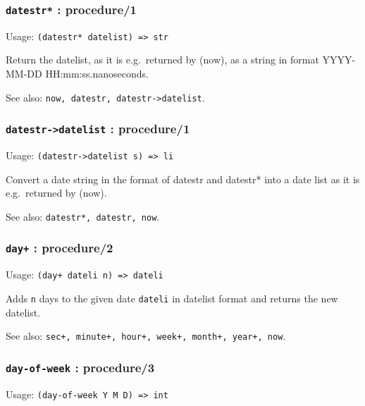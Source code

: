 \documentclass[
]{article}
\newcommand{\passthrough}[1]{#1}
\begin{document}
\hypertarget{datestr-procedure1-1}{%
\subsubsection{\texorpdfstring{\texttt{datestr*} :
procedure/1}{datestr* : procedure/1}}\label{datestr-procedure1-1}}

Usage: \passthrough{\lstinline!(datestr* datelist) => str!}

Return the datelist, as it is e.g.~returned by (now), as a string in
format YYYY-MM-DD HH:mm:ss.nanoseconds.

See also: \passthrough{\lstinline!now, datestr, datestr->datelist!}.

\hypertarget{datestr-datelist-procedure1}{%
\subsubsection{\texorpdfstring{\texttt{datestr-\textgreater{}datelist} :
procedure/1}{datestr-\textgreater datelist : procedure/1}}\label{datestr-datelist-procedure1}}

Usage: \passthrough{\lstinline!(datestr->datelist s) => li!}

Convert a date string in the format of datestr and datestr* into a date
list as it is e.g.~returned by (now).

See also: \passthrough{\lstinline!datestr*, datestr, now!}.

\hypertarget{day-procedure2}{%
\subsubsection{\texorpdfstring{\texttt{day+} :
procedure/2}{day+ : procedure/2}}\label{day-procedure2}}

Usage: \passthrough{\lstinline!(day+ dateli n) => dateli!}

Adds \passthrough{\lstinline!n!} days to the given date
\passthrough{\lstinline!dateli!} in datelist format and returns the new
datelist.

See also:
\passthrough{\lstinline!sec+, minute+, hour+, week+, month+, year+, now!}.

\hypertarget{day-of-week-procedure3}{%
\subsubsection{\texorpdfstring{\texttt{day-of-week} :
procedure/3}{day-of-week : procedure/3}}\label{day-of-week-procedure3}}

Usage: \passthrough{\lstinline!(day-of-week Y M D) => int!}
\end{document}
